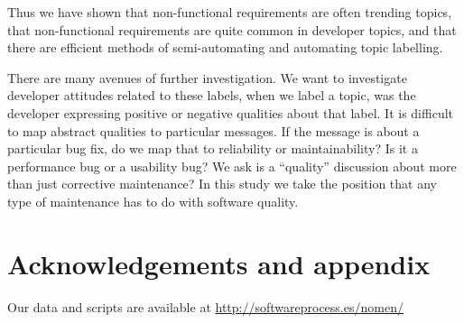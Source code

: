 \documentclass{acm_proc_article-sp}
\begin{document}
Thus we have shown that non-functional requirements are often trending topics, that non-functional requirements are quite common in developer topics, and that there are efficient methods of semi-automating and automating topic labelling.

There are many avenues of further investigation.  We want to investigate developer attitudes related to these labels, when we label a topic, was the developer expressing positive or negative qualities about that label.  It is difficult to map abstract qualities to particular messages. If the message is about a particular bug fix, do we map that to reliability or maintainability? Is it a performance bug or a usability bug? We ask is a ``quality'' discussion about more than just corrective maintenance? In this study we take the position that any type of maintenance has to do with software quality.



\section{Acknowledgements and appendix}
Our data and scripts are available at \url{http://softwareprocess.es/nomen/}


%

\end{document}
